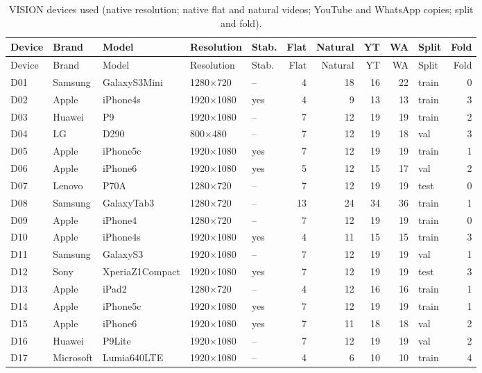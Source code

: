 \documentclass[11pt,a4paper]{article}
\begin{document}
{\small
\setlength{\tabcolsep}{4pt}
\begin{longtable}{lllllrrrrlr}
\caption{VISION devices used (native resolution; native flat and natural videos; YouTube and
WhatsApp copies; split and fold).}\\
\toprule
Device & Brand & Model & Resolution & Stab. & Flat & Natural & YT & WA & Split & Fold \\
\midrule
\endfirsthead
\toprule
Device & Brand & Model & Resolution & Stab. & Flat & Natural & YT & WA & Split & Fold \\
\midrule
\endhead
\bottomrule
\endfoot
D01 & Samsung & GalaxyS3Mini & 1280$\times$720 & -- & 4 & 18 & 16 & 22 & train & 0 \\
D02 & Apple & iPhone4s & 1920$\times$1080 & yes & 4 & 9 & 13 & 13 & train & 3 \\
D03 & Huawei & P9 & 1920$\times$1080 & -- & 7 & 12 & 19 & 19 & train & 2 \\
D04 & LG & D290 & 800$\times$480 & -- & 7 & 12 & 19 & 18 & val & 3 \\
D05 & Apple & iPhone5c & 1920$\times$1080 & yes & 7 & 12 & 19 & 19 & train & 1 \\
D06 & Apple & iPhone6 & 1920$\times$1080 & yes & 5 & 12 & 15 & 17 & val & 2 \\
D07 & Lenovo & P70A & 1280$\times$720 & -- & 7 & 12 & 19 & 19 & test & 0 \\
D08 & Samsung & GalaxyTab3 & 1280$\times$720 & -- & 13 & 24 & 34 & 36 & train & 1 \\
D09 & Apple & iPhone4 & 1280$\times$720 & -- & 7 & 12 & 19 & 19 & train & 0 \\
D10 & Apple & iPhone4s & 1920$\times$1080 & yes & 4 & 11 & 15 & 15 & train & 3 \\
D11 & Samsung & GalaxyS3 & 1920$\times$1080 & -- & 7 & 12 & 19 & 19 & val & 1 \\
D12 & Sony & XperiaZ1Compact & 1920$\times$1080 & yes & 7 & 12 & 19 & 19 & test & 3 \\
D13 & Apple & iPad2 & 1280$\times$720 & -- & 4 & 12 & 16 & 16 & train & 1 \\
D14 & Apple & iPhone5c & 1920$\times$1080 & yes & 7 & 12 & 19 & 19 & train & 1 \\
D15 & Apple & iPhone6 & 1920$\times$1080 & yes & 7 & 11 & 18 & 18 & val & 2 \\
D16 & Huawei & P9Lite & 1920$\times$1080 & -- & 7 & 12 & 19 & 19 & val & 2 \\
D17 & Microsoft & Lumia640LTE & 1920$\times$1080 & -- & 4 & 6 & 10 & 10 & train & 4 \\

\end{longtable}}
\end{document}
